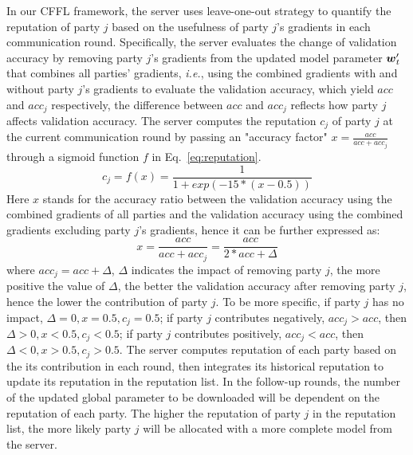 \documentclass{article}
\def\vec#1{\mathchoice{\mbox{\boldmath$\displaystyle#1$}}
  {\mbox{\boldmath$\textstyle#1$}}
  {\mbox{\boldmath$\scriptstyle#1$}}
  {\mbox{\boldmath$\scriptscriptstyle#1$}}}
\newcommand{\ie}{\textit{i.e.},\xspace}
\begin{document}
In our CFFL framework, %
the server uses leave-one-out strategy to quantify the reputation of party $j$ based on the usefulness of party $j$'s gradients in each communication round. Specifically, the server evaluates the change of validation accuracy by removing party $j$'s gradients from the updated model parameter $\vec{w}_t'$ that combines all parties' gradients, \ie using the combined gradients with and without party $j$'s gradients to evaluate the validation accuracy, which yield $acc$ and $acc_j$ respectively, the difference between $acc$ and $acc_j$ reflects how party $j$ affects validation accuracy. The server computes the reputation $c_j$ of party $j$ at the current communication round by passing an "accuracy factor" $x=\frac{acc}{acc+acc_j}$ through a sigmoid function $f$ in Eq.~\eqref{eq:reputation}.
\begin{equation}\label{eq:reputation}
	c_j=f(x)=\frac{1}{1+exp(-15*(x-0.5))}
\end{equation}
Here $x$ stands for the accuracy ratio between the validation accuracy using the combined gradients of all parties and the validation accuracy using the combined gradients excluding party $j$'s gradients, hence it can be further expressed as:
 \begin{equation}\label{eq:factor}
x=\frac{acc}{acc+acc_j}=\frac{acc}{2*acc+\Delta}
\end{equation}
where $acc_j=acc+\Delta$, $\Delta$ indicates the impact of removing party $j$, the more positive the value of $\Delta$, the better the validation accuracy after removing party $j$, hence the lower the contribution of party $j$. To be more specific, if party $j$ has no impact, $\Delta=0, x=0.5, c_j=0.5$; if party $j$ contributes negatively, $acc_j>acc$, then $\Delta>0, x<0.5, c_j<0.5$; if party $j$ contributes positively, $acc_j<acc$, then $\Delta<0, x>0.5, c_j>0.5$. The server computes reputation of each party based on the its contribution in each round, then integrates its historical reputation to update its reputation in the reputation list. %
In the follow-up rounds, the number of the updated global parameter to be downloaded will be dependent on the reputation of each party. The higher the reputation of party $j$ in the reputation list, the more likely party $j$ will be allocated with a more complete model from the server.%
\end{document}
